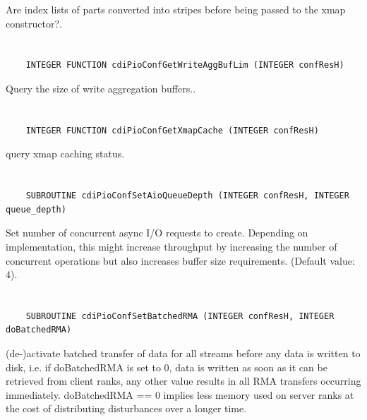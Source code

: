 Are index lists of parts converted
into stripes before being passed to the xmap constructor?.


\section*{\tt {}}

\begin{verbatim}
    INTEGER FUNCTION cdiPioConfGetWriteAggBufLim (INTEGER confResH)
\end{verbatim}

Query the size of write
aggregation buffers..


\section*{\tt {}}

\begin{verbatim}
    INTEGER FUNCTION cdiPioConfGetXmapCache (INTEGER confResH)
\end{verbatim}

query xmap caching status.


\section*{\tt {}}

\begin{verbatim}
    SUBROUTINE cdiPioConfSetAioQueueDepth (INTEGER confResH, INTEGER queue_depth)
\end{verbatim}

Set number of concurrent async I/O
requests to create. Depending on implementation, this might
increase throughput by increasing the number of concurrent
operations but also increases buffer size requirements.
(Default value: 4).


\section*{\tt {}}

\begin{verbatim}
    SUBROUTINE cdiPioConfSetBatchedRMA (INTEGER confResH, INTEGER doBatchedRMA)
\end{verbatim}

(de-)activate batched transfer of data
for all streams before any data is written to disk, i.e. if
doBatchedRMA is set to 0, data is written as soon as it can be
retrieved from client ranks, any other value results in all RMA
transfers occurring immediately. doBatchedRMA == 0 implies less
memory used on server ranks at the cost of distributing
disturbances over a longer time.


